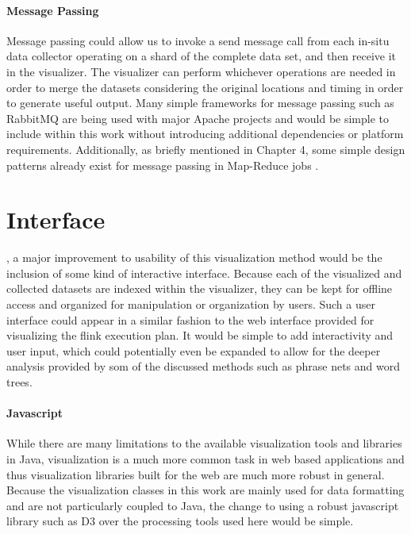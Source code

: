 \paragraph{Message Passing}
Message passing could allow us to invoke a send message call from each in-situ data collector operating on a shard of the complete data set, and then receive it in the visualizer. The visualizer can perform whichever operations are needed in order to merge the datasets considering the original locations and timing in order to generate useful output. Many simple frameworks for message passing such as RabbitMQ are being used with major Apache projects and would be simple to include within this work without introducing additional dependencies or platform requirements. Additionally, as briefly mentioned in Chapter 4, some simple design patterns already exist for message passing in Map-Reduce jobs \cite{Lin2010}.

\section{Interface}
\label{sec:interface}
, a major improvement to usability of this visualization method would be the inclusion of some kind of interactive interface. Because each of the visualized and collected datasets are indexed within the visualizer, they can be kept for offline access and organized for manipulation or organization by users. Such a user interface could appear in a similar fashion to the web interface provided for visualizing the flink execution plan. It would be simple to add interactivity and user input, which could potentially even be expanded to allow for the deeper analysis provided by som of the discussed methods such as phrase nets and word trees.

\paragraph{Javascript}
While there are many limitations to the available visualization tools and libraries in Java, visualization is a much more common task in web based applications and thus visualization libraries built for the web are much more robust in general. Because the visualization classes in this work are mainly used for data formatting and are not particularly coupled to Java, the change to using a robust javascript library such as D3 over the processing tools used here would be simple.

